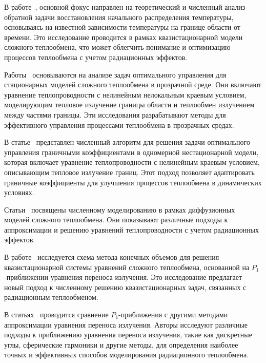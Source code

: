     В работе~\cite{amosov2010stationary}, основной фокус направлен на теоретический
    и численный анализ обратной задачи восстановления начального распределения температуры,
    основываясь на известной зависимости температуры на границе области от времени.
    Это исследование проводится в рамках квазистационарной модели сложного теплообмена,
    что может облегчить понимание и оптимизацию процессов теплообмена с учетом радиационных эффектов.


    Работы~\cite{birgelis2003optimal, meyer2006optimal, meyer2009state, Philip2010}
    основываются на анализе задач оптимального управления для стационарных моделей
    сложного теплообмена в прозрачной среде.
    Они включают уравнение теплопроводности с нелинейным нелокальным краевым условием,
    моделирующим тепловое излучение границы области и теплообмен излучением между частями границы.
    Эти исследования разрабатывают методы для эффективного управления процессами теплообмена
    в прозрачных средах.

    В статье~\cite{belmiloudi2014nonlinear} представлен численный алгоритм для решения
    задачи оптимального управления граничными коэффициентами в одномерной нестационарной модели,
    которая включает уравнение теплопроводности с нелинейным краевым условием,
    описывающим тепловое излучение границ.
    Этот подход позволяет адаптировать граничные коэффициенты для улучшения процессов
    теплообмена в динамических условиях.

    Статьи~\cite{kovtanyuk2013iterative, Thommes2002, Pinnau2008, Siewert1991}
    посвящены численному моделированию в рамках диффузионных моделей сложного теплообмена.
    Они показывают различные подходы к аппроксимации и решению уравнений теплопроводности
    с учетом радиационных эффектов.

    В работе~\cite{gallouet2016analysis} исследуется схема метода конечных объемов
    для решения квазистационарной системы уравнений сложного теплообмена,
    основанной на $P_1$-приближении уравнения переноса излучения.
    Это исследование предлагает новый подход к численному решению квазистационарных задач,
    связанных с радиационным теплообменом.


    В статьях~\cite{modest2014elliptic, frank2011adaptive, kovtanyuk2012, Thommes2002, Larsen2002, Frank2007}
    проводится сравнение $P_1$-приближения с другими методами аппроксимации уравнения переноса излучения.
    Авторы исследуют различные подходы к приближению уравнения переноса излучения,
    такие как дискретные углы, сферические гармоники и другие методы,
    для определения наиболее точных и эффективных способов моделирования радиационного теплообмена.

